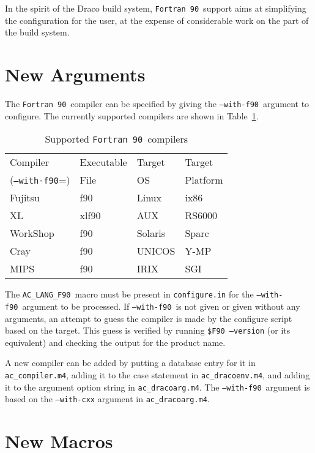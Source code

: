 \documentclass[11pt]{nmemo}
\newcommand{\fninety}{\texttt{Fortran~90}}
\newcommand{\withfninety}{\texttt{--with-f90}}
\newcommand{\langfninety}{\texttt{AC\_LANG\_F90}}
\begin{document}
In the spirit of the Draco build system, \fninety\ support aims at
simplifying the configuration for the user, at the expense of
considerable work on the part of the build system.

\section{New Arguments}

The \fninety\ compiler can be specified by giving the \withfninety\ 
argument to configure.  The currently supported compilers are shown in
Table~\ref{tbl:compilers}.

\begin{table}[hb]
\hrulefill
\begin{center}
\caption{Supported \fninety\ compilers}\label{tbl:compilers}
\begin{tabular}{l|l|l|l}
Compiler        & Executable & Target  & Target \\
(\withfninety=) & File       & OS      & Platform \\ \hline
Fujitsu         & f90        & Linux   & ix86 \\
XL	        & xlf90      & AUX     & RS6000 \\
WorkShop        & f90	     & Solaris & Sparc \\
Cray            & f90        & UNICOS  & Y-MP \\
MIPS            & f90        & IRIX    & SGI  
\end{tabular}
\end{center}
\hrulefill
\end{table}
The \langfninety\ macro must be present in \texttt{configure.in} for
the \withfninety\ argument to be processed.  If \withfninety\ is not
given or given without any arguments, an attempt to guess the compiler
is made by the configure script based on the target.  This guess is
verified by running \texttt{\$F90 --version} (or its equivalent) and
checking the output for the product name.  

A new compiler can be added by putting a database entry for it in
\texttt{ac\_compiler.m4}, adding it to the case statement in
\texttt{ac\_dracoenv.m4}, and adding it to the argument option string
in \texttt{ac\_dracoarg.m4}.  The \withfninety\ argument is based on
the \texttt{--with-cxx} argument in \texttt{ac\_dracoarg.m4}.

\section{New Macros}
\end{document}
